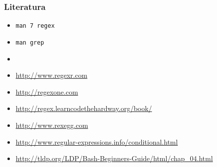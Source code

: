 \documentclass[table,usenames,dvipsnames]{beamer}
\newcommand{\shell}[1]{\texttt{#1}}
\begin{document}
\begin{frame}[t]
\frametitle{Literatura}
\begin{itemize}
	\item[] \shell{man 7 regex}
	\item[] \shell{man grep}
	\item[]
  \item[] \small\url{http://www.regexr.com}
  \item[] \small\url{http://regexone.com}
  \item[] \small\url{http://regex.learncodethehardway.org/book/}
  \item[] \small\url{http://www.rexegg.com}
  \item[] \small\url{http://www.regular-expressions.info/conditional.html} 
  \item[] \small\url{http://tldp.org/LDP/Bash-Beginners-Guide/html/chap_04.html}
\end{itemize}
\end{frame}
\end{document}

